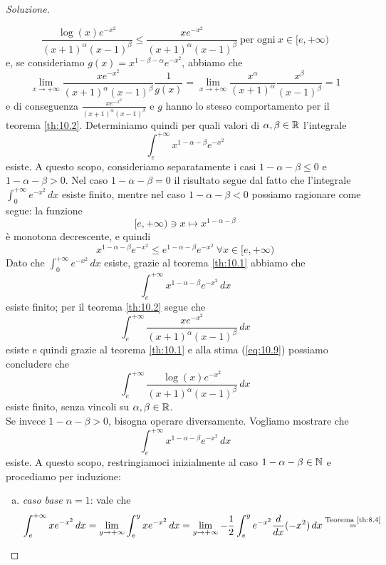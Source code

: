 \begin{proof}[Soluzione]
\begin{enumerate}[(i)]
\begin{equation}
            \frac{\log(x)e^{-x^2}}{(x+1)^\alpha(x-1)^\beta} \le \frac{xe^{-x^2}}{(x+1)^\alpha(x-1)^\beta} \ \text{per ogni} \ x\in [e,+\infty)
        \end{equation}
        e, se consideriamo $g(x) = x^{1-\beta-\alpha}e^{-x^2}$, abbiamo che
        \[
        \lim_{x\to +\infty} \frac{xe^{-x^2}}{(x+1)^\alpha (x-1)^\beta} \frac{1}{g(x)} = \lim_{x\to +\infty} \frac{x^\alpha}{(x+1)^\alpha} \frac{x^\beta}{(x-1)^\beta} = 1
        \]
        e di conseguenza $\frac{xe^{-x^2}}{(x+1)^\alpha (x-1)^\beta}$ e $g$ hanno lo stesso comportamento per il teorema \ref{th:10.2}. Determiniamo quindi per quali valori di $\alpha, \beta\in\amsbb{R}$ l'integrale
        \[
        \int_e^{+\infty} x^{1-\alpha-\beta} e^{-x^2}
        \]
        esiste. A questo scopo, consideriamo separatamente i casi $1-\alpha-\beta\le 0$ e $1-\alpha-\beta>0$. Nel caso $1-\alpha-\beta=0$ il risultato segue dal fatto che l'integrale $\int_0^{+\infty} e^{-x^2}\, dx$ esiste finito, mentre nel caso $1-\alpha-\beta<0$ possiamo ragionare come segue: la funzione
        \[
        [e,+\infty)\ni x \mapsto x^{1-\alpha-\beta}
        \]
        è monotona decrescente, e quindi
        \[
        x^{1-\alpha-\beta}e^{-x^2}\le e^{1-\alpha-\beta}e^{-x^2} \ \forall x\in[e, +\infty)
        \]
        Dato che $\int_0^{+\infty}e^{-x^2}\, dx$ esiste, grazie al teorema \ref{th:10.1} abbiamo che
        \[
        \int_e^{+\infty} x^{1-\alpha-\beta} e^{-x^2}\, dx
        \]
        esiste finito; per il teorema \ref{th:10.2} segue che
        \[
        \int_e^{+\infty} \frac{xe^{-x^2}}{(x+1)^\alpha(x-1)^\beta}\, dx
        \]
        esiste e quindi grazie al teorema \ref{th:10.1} e alla stima (\ref{eq:10.9}) possiamo concludere che
        \[
        \int_e^{+\infty}\frac{\log(x)e^{-x^2}}{(x+1)^\alpha(x-1)^\beta}\, dx
        \]
        esiste finito, senza vincoli su $\alpha,\beta\in\amsbb{R}$.\\
        Se invece $1-\alpha-\beta>0$, bisogna operare diversamente. Vogliamo mostrare che
        \[
        \int_e^{+\infty}x^{1-\alpha-\beta} e^{-x^2}\, dx 
        \]
        esiste. A questo scopo, restringiamoci inizialmente al caso $1-\alpha-\beta\in\amsbb{N}$ e procediamo per induzione:
        \begin{enumerate}[(a)]
            \item \emph{caso base $n=1$}: vale che
            \[
            \begin{split}
                \int_e^{+\infty} x e^{-x^2}\, dx & = \lim_{y\to +\infty} \int_e^y x e^{-x^2}\, dx = \lim_{y\to +\infty} -\frac{1}{2}\int_e^y e^{-x^2} \frac{d}{dx}(-x^2)\, dx \overset{\text{Teorema \ref{th:8.4}}}{=} \\

\end{split}\]
\end{enumerate}
\end{enumerate}
\end{proof}
